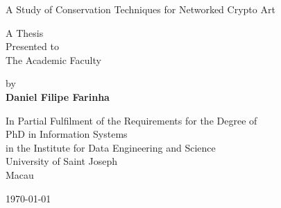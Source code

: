 

\begin{titlepage}
    \begin{center}
        \vspace*{1cm}
        
        
        
        \vspace{3.5cm}
        

        \LARGE
        A Study of Conservation Techniques for Networked Crypto Art
        
        \vspace{2cm}

        \normalsize
        A Thesis\\
        Presented to\\
        The Academic Faculty
        
        \vspace{1cm}
        
        by\\
        \textbf{Daniel Filipe Farinha}
        
     
        \vfill
       
        
 
 	\vspace{0.5cm}

        \normalsize
        In Partial Fulfilment of the Requirements for the Degree of \\
        PhD in Information Systems\\
        in the Institute for Data Engineering and Science\\
        University of Saint Joseph\\
        Macau\\
        
        \vspace{1cm}

	\monthyeardate\today
	        
    \end{center}
\end{titlepage}
